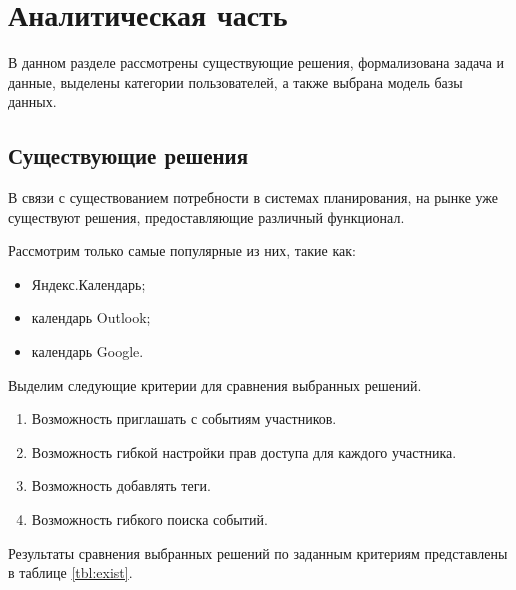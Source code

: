 \section{Аналитическая часть}

В данном разделе рассмотрены существующие решения, формализована задача и данные, выделены категории пользователей, а также выбрана модель базы данных.

\subsection{Существующие решения}

В связи с существованием потребности в системах планирования, на рынке уже существуют решения, предоставляющие различный функционал.

Рассмотрим только самые популярные из них, такие как:
\begin{itemize}[]
	\item Яндекс.Календарь;
	\item календарь Outlook;
	\item календарь Google.
\end{itemize}

Выделим следующие критерии для сравнения выбранных решений.
\begin{enumerate}[]
	\item Возможность приглашать с событиям участников.
	\item Возможность гибкой настройки прав доступа для каждого участника.
	\item Возможность добавлять теги.
	\item Возможность гибкого поиска событий.
\end{enumerate}

Результаты сравнения выбранных решений по заданным критериям представлены в таблице \ref{tbl:exist}.

